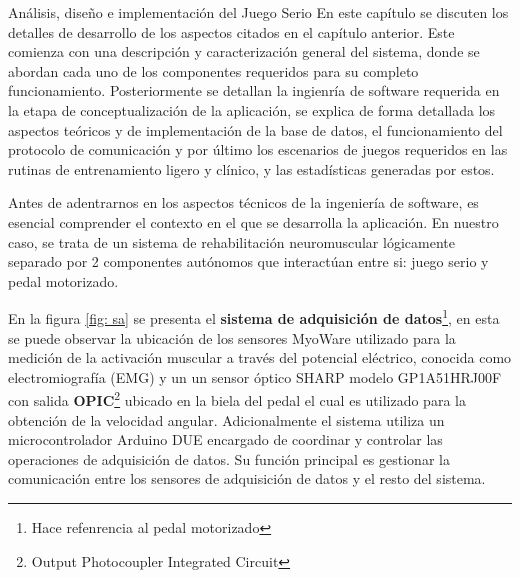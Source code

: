 \begin{thesischapter}{2} {Análisis, diseño e implementación del Juego Serio}
    En este capítulo se discuten los detalles de desarrollo de los aspectos citados en el capítulo
    anterior. Este comienza con una descripción y caracterización general del sistema, donde se  abordan 
    cada uno de los componentes requeridos para su completo funcionamiento. Posteriormente se detallan 
    la ingienría de software requerida en la etapa de conceptualización de la aplicación, se explica de forma 
    detallada los aspectos teóricos y de implementación de la base de datos, el funcionamiento del protocolo de comunicación 
    y por último los escenarios de juegos requeridos en las rutinas de entrenamiento ligero y clínico, y las estadísticas generadas 
    por estos.

    Antes de adentrarnos en los aspectos técnicos de la ingeniería de software, es esencial comprender el contexto en 
    el que se desarrolla la aplicación. En nuestro caso, se trata de un sistema de rehabilitación neuromuscular lógicamente 
    separado por 2 componentes autónomos que interactúan entre si: juego serio y pedal motorizado. 

    \vspace{10pt} %
    En la figura \ref{fig: sa} se presenta el \textbf{sistema de adquisición de datos}\footnote{Hace refenrencia al pedal motorizado}, 
    en esta se puede observar la ubicación de los sensores MyoWare  utilizado para la medición de la activación muscular a través del potencial eléctrico, 
    conocida como electromiografía (EMG) y un un sensor óptico SHARP modelo GP1A51HRJ00F con salida  \textbf{OPIC}\footnote{Output Photocoupler 
    Integrated Circuit} ubicado en la biela del pedal el cual es utilizado para la obtención de la velocidad angular. Adicionalmente el sistema 
    utiliza un microcontrolador Arduino DUE encargado de coordinar y controlar las operaciones de adquisición de 
    datos. Su función principal es gestionar la comunicación entre los sensores de adquisición de datos y el resto del sistema.


\end{thesischapter}
